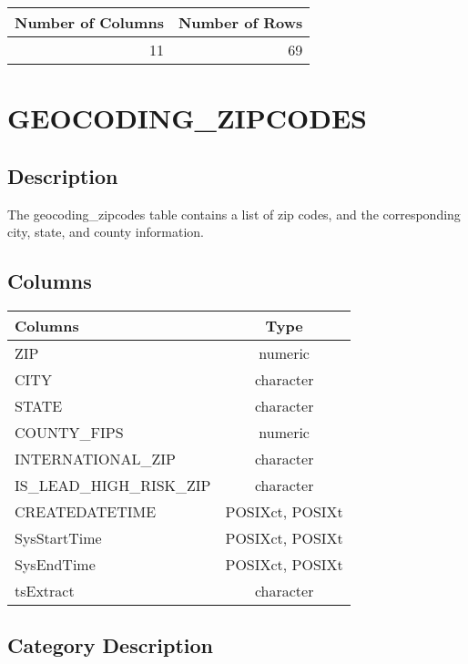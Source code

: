 \documentclass[
  letterpaper,
  DIV=11,
  numbers=noendperiod]{scrreprt}
\begin{document}
\begin{longtable}{rr}
\toprule
Number of Columns & Number of Rows \\ 
\midrule
11 & 69 \\ 
\bottomrule
\end{longtable}

\hypertarget{geocoding_zipcodes}{%
\chapter*{GEOCODING\_ZIPCODES}\label{geocoding_zipcodes}}

\hypertarget{description-12}{%
\section*{Description}\label{description-12}}

The geocoding\_zipcodes table contains a list of zip codes, and the
corresponding city, state, and county information.

\hypertarget{columns-12}{%
\section*{Columns}\label{columns-12}}

\begin{longtable}{lc}
\toprule
Columns & Type \\ 
\midrule
ZIP & numeric \\ 
CITY & character \\ 
STATE & character \\ 
COUNTY\_FIPS & numeric \\ 
INTERNATIONAL\_ZIP & character \\ 
IS\_LEAD\_HIGH\_RISK\_ZIP & character \\ 
CREATEDATETIME & POSIXct, POSIXt \\ 
SysStartTime & POSIXct, POSIXt \\ 
SysEndTime & POSIXct, POSIXt \\ 
tsExtract & character \\ 
\bottomrule
\end{longtable}

\hypertarget{category-description-12}{%
\section*{Category Description}\label{category-description-12}}
\end{document}
